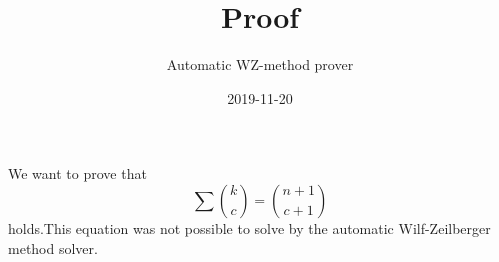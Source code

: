 \documentclass{article}
\title{Proof}
\author{Automatic WZ-method prover}
\date{2019-11-20}
\begin{document}
\maketitle
We want to prove that
\begin{equation}\label{Eq: 1}
\sum \binom{k}{c} = \binom{n+1}{c+1}
\end{equation}
holds.This equation was not possible to solve by the automatic Wilf-Zeilberger method solver.
\end{document}
